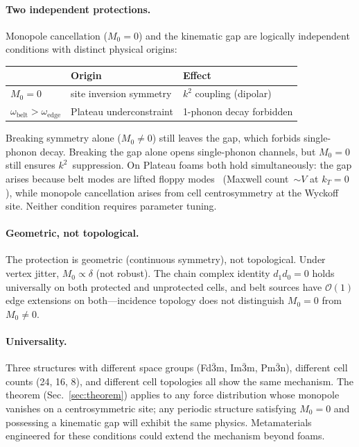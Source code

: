 \documentclass[12pt]{article}
\newcommand{\oedge}{\omega_{\mathrm{edge}}}
\newcommand{\obelt}{\omega_{\mathrm{belt}}}
\begin{document}
\paragraph{Two independent protections.}
Monopole cancellation ($M_0 = 0$) and the kinematic gap are logically
independent conditions with distinct physical origins:

\begin{tabular}{lll}
\hline
& Origin & Effect \\
\hline
$M_0 = 0$ & site inversion symmetry & $k^2$ coupling (dipolar) \\
$\obelt > \oedge$ & Plateau underconstraint & 1-phonon decay forbidden \\
\hline
\end{tabular}

\noindent
Breaking symmetry alone ($M_0 \neq 0$) still leaves the gap, which
forbids single-phonon decay.  Breaking the gap alone opens
single-phonon channels, but $M_0 = 0$ still ensures
$k^2$~suppression.  On Plateau foams both hold simultaneously: the
gap arises because belt modes are lifted floppy
modes~\cite{Lubensky2015} (Maxwell count~$\sim\!V$ at $k_T = 0$),
while monopole cancellation arises from cell centrosymmetry at the
Wyckoff site.  Neither condition requires parameter tuning.

\paragraph{Geometric, not topological.}
The protection is geometric (continuous symmetry), not topological.
Under vertex jitter, $M_0 \propto \delta$ (not robust).  The chain
complex identity $d_1 d_0 = 0$ holds universally on both protected
and unprotected cells, and belt sources have $\mathcal{O}(1)$ edge
extensions on both---incidence topology does not distinguish $M_0 = 0$
from $M_0 \neq 0$.

\paragraph{Universality.}
Three structures with different space groups (Fd$\bar{3}$m,
Im$\bar{3}$m, Pm$\bar{3}$n), different cell counts (24, 16, 8), and
different cell topologies all show the same mechanism.  The theorem
(Sec.~\ref{sec:theorem}) applies to any force distribution whose
monopole vanishes on a centrosymmetric site; any periodic structure
satisfying $M_0 = 0$ and possessing a kinematic gap will exhibit the
same physics.  Metamaterials engineered for these conditions could
extend the mechanism beyond foams.
\end{document}

